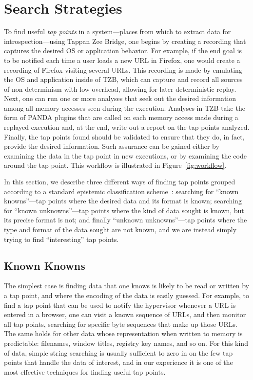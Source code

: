 \section{Search Strategies}
\label{sec:technical}

To find useful \emph{tap points} in a system---places from which to
extract data for introspection---using Tappan Zee Bridge, one begins by
creating a recording that captures the desired OS or application
behavior. For example, if the end goal is to be notified each time a
user loads a new URL in Firefox, one would create a recording of Firefox
visiting several URLs. This recording is made by emulating the OS and
application inside of TZB, which can capture and record all sources of
non-determinism with low overhead, allowing for later deterministic
replay. Next, one can run one or more analyses that seek out the desired
information among all memory accesses seen during the execution.
Analyses in TZB take the form of PANDA plugins that are called on each
memory access made during a replayed execution and, at the end, write
out a report on the tap points analyzed. Finally, the tap points found
should be validated to ensure that they do, in fact, provide the desired
information. Such assurance can be gained either by examining the data
in the tap point in new executions, or by examining the code around the
tap point. This workflow is illustrated in Figure~\ref{fig:workflow}.

In this section, we describe three different ways of finding tap points
grouped according to a standard epistemic classification
scheme~\cite{Rumsfeld:2002}: searching for ``known knowns''---tap points
where the desired data and its format is known; searching for ``known
unknowns''---tap points where the kind of data sought is known, but its
precise format is not; and finally ``unknown unknowns''---tap points
where the type and format of the data sought are not known, and we are
instead simply trying to find ``interesting'' tap points.

\subsection{Known Knowns}

The simplest case is finding data that one knows is likely to be read or
written by a tap point, and where the encoding of the data is easily
guessed. For example, to find a tap point that can be used to notify
the hypervisor whenever a URL is entered in a browser, one can visit a
known sequence of URLs, and then monitor all tap points, searching for
specific byte sequences that make up those URLs. The same holds for
other data whose representation when written to memory is predictable:
filenames, window titles, registry key names, and so on. For this kind
of data, simple string searching is usually sufficient to zero in on the
few tap points that handle the data of interest, and in our experience
it is one of the most effective techniques for finding useful tap
points.

